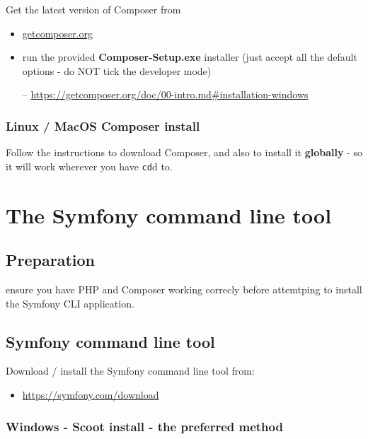 \documentclass[a4paperpaper,openright]{book}
\providecommand{\tightlist}{%
  \setlength{\itemsep}{0pt}\setlength{\parskip}{0pt}}
\begin{document}
Get the latest version of Composer from

\begin{itemize}
\item
  \href{https://getcomposer.org/}{getcomposer.org}
\item
  run the provided \textbf{Composer-Setup.exe} installer (just accept
  all the default options - do NOT tick the developer mode)

  -- \url{https://getcomposer.org/doc/00-intro.md\#installation-windows}
\end{itemize}

\hypertarget{linux-macos-composer-install}{%
\subsection{Linux / MacOS Composer
install}\label{linux-macos-composer-install}}

Follow the instructions to download Composer, and also to install it
\textbf{globally} - so it will work wherever you have \texttt{cd}d to.

\hypertarget{the-symfony-command-line-tool}{%
\chapter{\texorpdfstring{The Symfony command line
tool\label{symfony_clis}}{The Symfony command line tool}}\label{the-symfony-command-line-tool}}

\hypertarget{preparation-2}{%
\section{Preparation}\label{preparation-2}}

ensure you have PHP and Composer working correcly before attemtping to
install the Symfony CLI application.

\hypertarget{symfony-command-line-tool}{%
\section{Symfony command line tool}\label{symfony-command-line-tool}}

Download / install the Symfony command line tool from:

\begin{itemize}
\tightlist
\item
  \url{https://symfony.com/download}
\end{itemize}

\hypertarget{windows---scoot-install---the-preferred-method}{%
\subsection{Windows - Scoot install - the preferred
method}\label{windows---scoot-install---the-preferred-method}}
\end{document}

